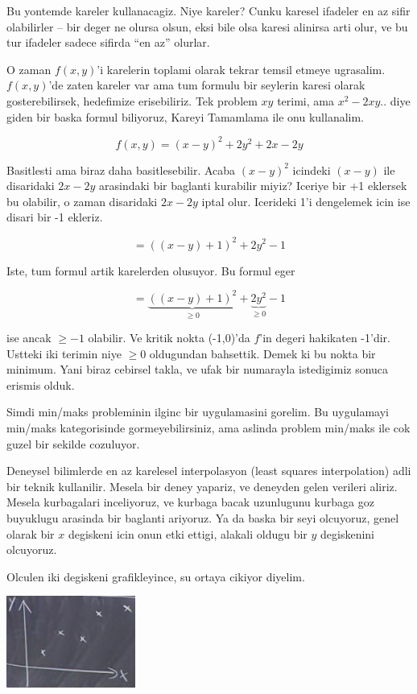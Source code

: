 \documentclass[12pt,fleqn]{article}\usepackage{../common}
\begin{document}
Bu yontemde kareler kullanacagiz. Niye kareler? Cunku karesel ifadeler en
az sifir olabilirler -- bir deger ne olursa olsun, eksi bile olsa karesi
alinirsa arti olur, ve bu tur ifadeler sadece sifirda ``en az'' olurlar.

O zaman $f(x,y)$'i karelerin toplami olarak tekrar temsil etmeye
ugrasalim. $f(x,y)$'de zaten kareler var ama tum formulu bir seylerin
karesi olarak gosterebilirsek, hedefimize erisebiliriz. Tek problem $xy$
terimi, ama $x^2 - 2xy..$ diye giden bir baska formul biliyoruz, Kareyi
Tamamlama ile onu kullanalim.

\[ f(x,y) = (x-y)^2 + 2y^2 + 2x - 2y \]

Basitlesti ama biraz daha basitlesebilir. Acaba $(x-y)^2$ icindeki $(x-y)$
ile disaridaki $2x - 2y$ arasindaki bir baglanti kurabilir miyiz? Iceriye
bir +1 eklersek bu olabilir, o zaman disaridaki $2x - 2y$ iptal
olur. Icerideki 1'i dengelemek icin ise disari bir -1 ekleriz.

\[  = ((x-y) + 1)^2 + 2y^2 - 1\]

Iste, tum formul artik karelerden olusuyor. Bu formul eger 

\[  = \underbrace{((x-y) + 1)^2}_{\ge 0} + \underbrace{2y^2}_{\ge 0} - 1\]

ise ancak $\ge -1$ olabilir. Ve kritik nokta (-1,0)'da $f$'in degeri
hakikaten -1'dir. Ustteki iki terimin niye $\ge 0$ oldugundan
bahsettik. Demek ki bu nokta bir minimum.  Yani biraz cebirsel takla, ve
ufak bir numarayla istedigimiz sonuca erismis olduk.

Simdi min/maks probleminin ilginc bir uygulamasini gorelim. Bu uygulamayi
min/maks kategorisinde gormeyebilirsiniz, ama aslinda problem min/maks ile
cok guzel bir sekilde cozuluyor.

Deneysel bilimlerde en az karelesel interpolasyon (least squares
interpolation) adli bir teknik kullanilir. Mesela bir deney yapariz, ve
deneyden gelen verileri aliriz. Mesela kurbagalari inceliyoruz, ve kurbaga
bacak uzunlugunu kurbaga goz buyuklugu arasinda bir baglanti ariyoruz. Ya
da baska bir seyi olcuyoruz, genel olarak bir $x$ degiskeni icin onun etki
ettigi, alakali oldugu bir $y$ degiskenini olcuyoruz.

Olculen iki degiskeni grafikleyince, su ortaya cikiyor diyelim.

\includegraphics[height=3cm]{9_5.png}
\end{document}
